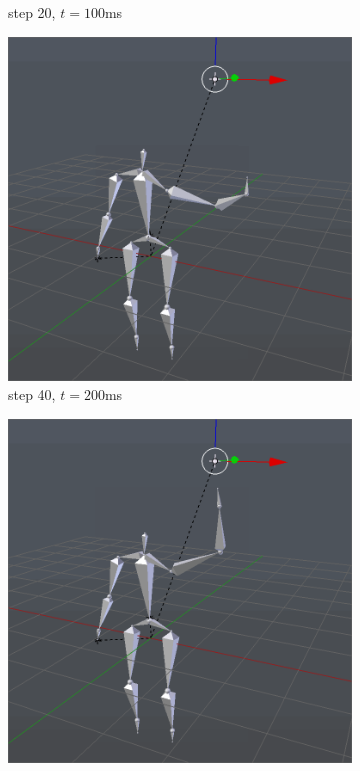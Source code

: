 \documentclass[10pt,twocolumn,letterpaper]{article}
\begin{document}
\begin{figure}[h]
\begin{subfigure}{0.2\textwidth}
        \caption{step 20, $t=100$ms}
    \end{subfigure}\begin{subfigure}{0.2\textwidth}
        \centering
        \includegraphics[width=.9\linewidth]{raise-circ-2.png}
        \caption{step 40, $t=200$ms}
    \end{subfigure}\begin{subfigure}{0.2\textwidth}
        \centering
        \includegraphics[width=.9\linewidth]{raise-circ-3.png}

\end{subfigure}
\end{figure}
\end{document}
